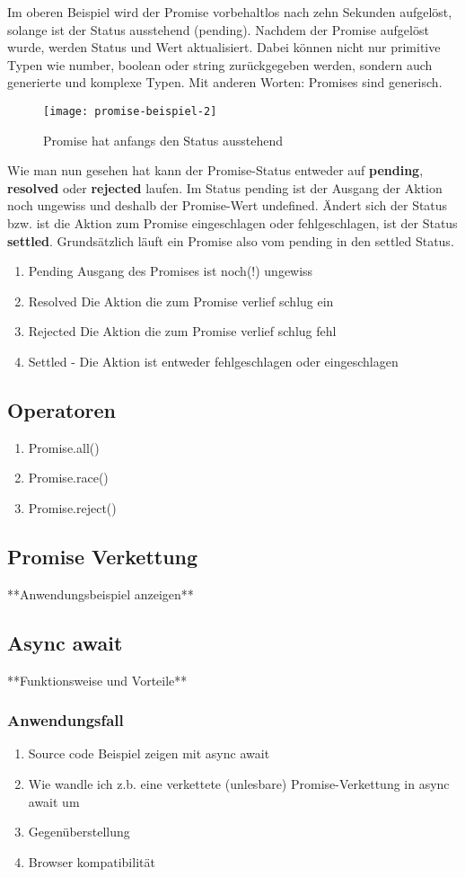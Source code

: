 \noindent
Im oberen Beispiel wird der Promise vorbehaltlos nach zehn Sekunden aufgelöst, solange ist der Status ausstehend (pending). Nachdem der Promise aufgelöst wurde, werden Status und Wert aktualisiert. Dabei können nicht nur primitive Typen wie number, boolean oder string zurückgegeben werden, sondern auch generierte und komplexe Typen. Mit anderen Worten: Promises sind generisch.

\begin{figure}[H]
\centering
\texttt{[image: promise-beispiel-2]}
\caption{Promise hat anfangs den Status \glqq{}ausstehend\grqq{}}
\end{figure}

\noindent
Wie man nun gesehen hat kann der Promise-Status entweder auf \textbf{pending}, \textbf{resolved} oder \textbf{rejected} laufen. Im Status pending ist der Ausgang der Aktion noch ungewiss und deshalb der Promise-Wert undefined. Ändert sich der Status bzw. ist die Aktion zum Promise eingeschlagen oder fehlgeschlagen, ist der Status \textbf{settled}. Grundsätzlich läuft ein Promise also vom pending in den settled Status.

\begin{enumerate} 
\item Pending Ausgang des Promises ist noch(!) ungewiss
\item Resolved Die Aktion die zum Promise verlief schlug ein
\item Rejected Die Aktion die zum Promise verlief schlug fehl
\item Settled - Die Aktion ist entweder fehlgeschlagen oder eingeschlagen
\end{enumerate}

\subsection{Operatoren}

\begin{enumerate} 
\item Promise.all()
\item Promise.race() 
\item Promise.reject()
\end{enumerate}

\subsection{Promise Verkettung}
**Anwendungsbeispiel anzeigen**

\subsection{Async await}
**Funktionsweise und Vorteile**

\subsubsection{Anwendungsfall}

\begin{enumerate} 
\item Source code Beispiel zeigen mit async await
\item Wie wandle ich z.b. eine verkettete (unlesbare) Promise-Verkettung in async await um 
\item Gegenüberstellung
\item Browser kompatibilität
\end{enumerate}



